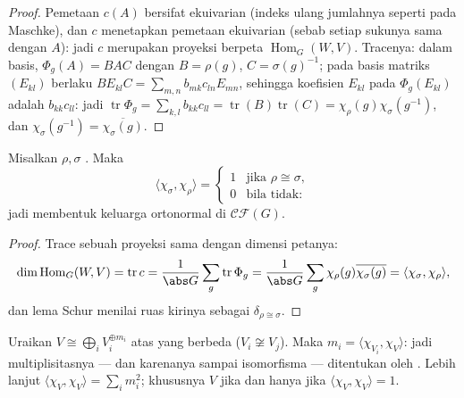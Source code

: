 \begin{proof}
Pemetaan $c(A)$ bersifat ekuivarian (indeks ulang jumlahnya seperti pada Maschke), dan $c$
menetapkan pemetaan ekuivarian (sebab setiap sukunya sama dengan $A$): jadi $c$ merupakan
proyeksi berpeta $\operatorname{Hom}_G(W, V)$. Tracenya: dalam
basis, $\Phi_g(A) = BAC$ dengan $B = \rho(g)$, $C = \sigma(g)^{-1}$;
pada basis matriks $(E_{kl})$ berlaku $BE_{kl}C = \sum_{m,n}
b_{mk}c_{ln}E_{mn}$, sehingga koefisien $E_{kl}$ pada
$\Phi_g(E_{kl})$ adalah $b_{kk}c_{ll}$: jadi $\operatorname{tr}\Phi_g =
\sum_{k,l}b_{kk}c_{ll} = \operatorname{tr}(B)
\operatorname{tr}(C) = \chi_\rho(g)\chi_\sigma(g^{-1})$, dan
$\chi_\sigma(g^{-1}) = \overline{\chi_\sigma(g)}$.
\end{proof}

\begin{theorem}
\label{thm:b3:representations:orthogonality}
Misalkan $\rho, \sigma$ \emph{}. Maka
\[
\langle\chi_\sigma, \chi_\rho\rangle =
\begin{cases}
1 & \text{jika } \rho \cong \sigma,\\
0 & \text{bila tidak:}
\end{cases}
\]
jadi   membentuk keluarga ortonormal di
$\mathcal{CF}(G)$.
\end{theorem}

\begin{proof}
Trace sebuah proyeksi sama dengan dimensi petanya:
\[
\dim\operatorname{Hom}_G(W, V) = \operatorname{tr} c
= \frac1{\abs G}\sum_g \operatorname{tr}\Phi_g
= \frac1{\abs G}\sum_g \chi_\rho(g)\overline{\chi_\sigma(g)}
= \langle \chi_\sigma, \chi_\rho\rangle,
\]
dan lema Schur menilai ruas kirinya sebagai $\delta_{\rho \cong
\sigma}$.
\end{proof}

\begin{corollary}\label{cor:b3:representations:multiplicity}
Uraikan $V \cong \bigoplus_i V_i^{\oplus m_i}$ atas 
yang berbeda ($V_i \not\cong V_j$). Maka $m_i = \langle
\chi_{V_i}, \chi_V\rangle$: jadi multiplisitasnya --- dan karenanya
 sampai isomorfisma --- ditentukan oleh
. Lebih lanjut $\langle \chi_V, \chi_V\rangle = \sum_i
m_i^2$; khususnya $V$  jika dan hanya jika $\langle\chi_V,
\chi_V\rangle = 1$.
\end{corollary}

